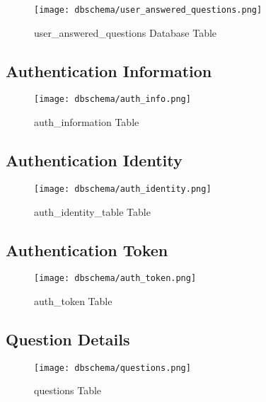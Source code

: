 \begin{figure}[H]
\begin{center}
\texttt{[image: dbschema/user\_answered\_questions.png]}
\end{center}
\caption{ user\_answered\_questions Database Table}
\label{db_user_answered_questions}
\end{figure}

\subsection{Authentication Information}

\begin{figure}[H]
\begin{center}
\texttt{[image: dbschema/auth\_info.png]}
\end{center}
\caption{ auth\_information Table}
\label{auth_information_table}
\end{figure}


\subsection{Authentication Identity}

\begin{figure}[H]
\begin{center}
\texttt{[image: dbschema/auth\_identity.png]}
\end{center}
\caption{ auth\_identity\_table Table}
\label{auth_identity_table}
\end{figure}

\subsection{Authentication Token}

\begin{figure}[H]
\begin{center}
\texttt{[image: dbschema/auth\_token.png]}
\end{center}
\caption{ auth\_token Table}
\label{auth_token_table}
\end{figure}


\subsection{Question Details}

\begin{figure}[H]
\begin{center}
\texttt{[image: dbschema/questions.png]}
\end{center}
\caption{questions Table}
\label{questions_table}
\end{figure}

